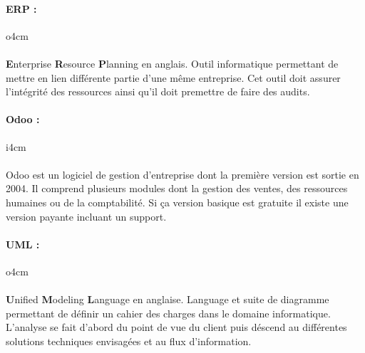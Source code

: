 
\paragraph{ERP : }
\begin{wrapfigure}[4]{o}{4cm}
\end{wrapfigure}
\paragraph{}

\textbf{E}nterprise \textbf{R}esource \textbf{P}lanning  en anglais. Outil informatique permettant de mettre en lien différente partie d'une même entreprise. Cet outil doit assurer l'intégrité des ressources ainsi qu'il doit premettre de faire des audits.

\paragraph{Odoo : }
\begin{wrapfigure}[5]{i}{4cm}
\end{wrapfigure}
\paragraph{}
Odoo est un logiciel de gestion d'entreprise dont la première version est sortie en 2004. Il comprend plusieurs modules dont la gestion des ventes, des ressources humaines ou de la comptabilité. Si ça version basique est gratuite il existe une version payante incluant un support.

\paragraph{UML : }
\begin{wrapfigure}[5]{o}{4cm}
\end{wrapfigure}
\paragraph{}
\textbf{U}nified \textbf{M}odeling \textbf{L}anguage en anglaise. Language et suite de diagramme permettant de définir un cahier des charges dans le domaine informatique. L'analyse se fait d'abord du point de vue du client puis déscend au différentes solutions techniques envisagées et au flux d'information.
